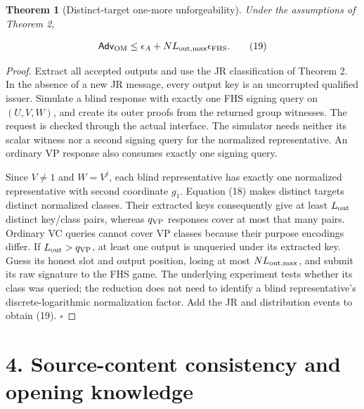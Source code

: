 \documentclass[11pt]{article}
\newtheorem{theorem}{Theorem}
\begin{document}
\begin{theorem}[Distinct-target one-more unforgeability]
Under the assumptions of Theorem 2,

\[
\mathsf{Adv}_{\rm OM}\le
\epsilon_A+NL_{\rm out,max}\epsilon_{\rm FHS}.
\tag{19}
\]

\end{theorem}
\begin{proof}
Extract all accepted outputs and use the JR classification of Theorem 2. In the absence of a new JR message, every output key is an uncorrupted qualified issuer. Simulate a blind response with exactly one FHS signing query on \((U,V,W)\), and create its outer proofs from the returned group witnesses. The request is checked through the actual interface. The simulator needs neither its scalar witness nor a second signing query for the normalized representative. An ordinary VP response also consumes exactly one signing query.

Since \(V\ne1\) and \(W=V^j\), each blind representative has exactly one normalized representative with second coordinate \(g_1\). Equation (18) makes distinct targets distinct normalized classes. Their extracted keys consequently give at least \(L_{\rm out}\) distinct key/class pairs, whereas \(q_{\rm VP}\) responses cover at most that many pairs. Ordinary VC queries cannot cover VP classes because their purpose encodings differ. If \(L_{\rm out}>q_{\rm VP}\), at least one output is unqueried under its extracted key. Guess its honest slot and output position, losing at most \(NL_{\rm out,max}\), and submit its raw signature to the FHS game. The underlying experiment tests whether its class was queried; the reduction does not need to identify a blind representative's discrete-logarithmic normalization factor. Add the JR and distribution events to obtain (19). \(\square\)

\end{proof}
\section*{4. Source-content consistency and opening knowledge}
\end{document}
